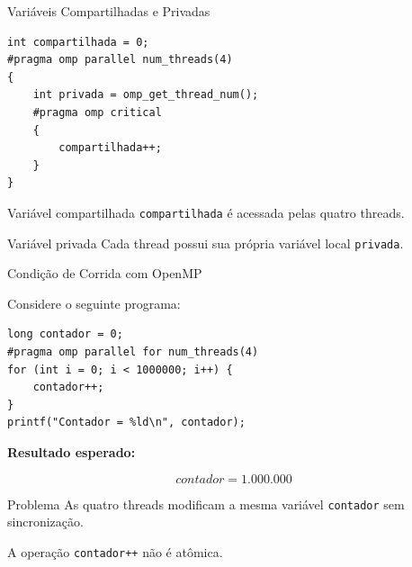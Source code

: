 \documentclass[aspectratio=169,11pt]{beamer}
\begin{document}

\begin{frame}[fragile]{Variáveis Compartilhadas e Privadas}

\small
\begin{verbatim}
int compartilhada = 0;
#pragma omp parallel num_threads(4)
{
    int privada = omp_get_thread_num();
    #pragma omp critical
    {
        compartilhada++;
    }
}
\end{verbatim}

\vspace{0.3cm}

\begin{block}{Variável compartilhada}
\texttt{compartilhada} é acessada pelas quatro threads.
\end{block}

\begin{block}{Variável privada}
Cada thread possui sua própria variável local
\texttt{privada}.
\end{block}


\end{frame}



\begin{frame}[fragile]{Condição de Corrida com OpenMP}

Considere o seguinte programa:

\small
\begin{verbatim}
long contador = 0;
#pragma omp parallel for num_threads(4)
for (int i = 0; i < 1000000; i++) {
    contador++;
}
printf("Contador = %ld\n", contador);
\end{verbatim}

\vspace{0.3cm}

\textbf{Resultado esperado:}

\[
contador = 1.000.000
\]

\begin{alertblock}{Problema}
As quatro threads modificam a mesma variável
\texttt{contador} sem sincronização.

A operação \texttt{contador++} não é atômica.
\end{alertblock}

\end{frame}
\end{document}
